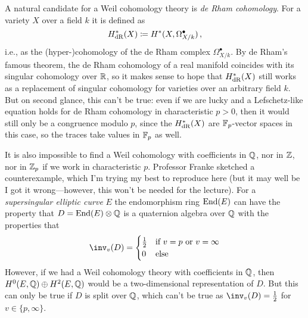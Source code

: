 \documentclass[a4paper, 10pt, oneside, DIV=9, chapterprefix=true, numbers=enddot]{scrbook}
\begin{document}
	A natural candidate for a Weil cohomology theory is \emph{de Rham cohomology}. For a variety $X$ over a field $k$ it is defined as 
	\begin{equation*}
		H_{\mathrm{dR}}^*(X)\coloneqq H^*(X,\Omega_{X/k}^\bullet)\,,
	\end{equation*}
	i.e., as the (hyper-)cohomology of the de Rham complex $\Omega_{X/k}^\bullet$.	By de Rham's famous theorem, the de Rham cohomology of a real manifold coincides with its singular cohomology over $\mathbb{R}$, so it makes sense to hope that $H_{\mathrm{dR}}^*(X)$ still works as a replacement of singular cohomology for varieties over an arbitrary field $k$. But on second glance, this can't be true: even if we are lucky and a Lefschetz-like equation holds for de Rham cohomology in characteristic $p >0$, then it would still only be a congruence modulo $p$, since the $H_{\mathrm{dR}}^*(X)$ are $\mathbb{F}_p$-vector spaces in this case, so the traces take values in $\mathbb{F}_p$ as well.
	
	It is also impossible to find a Weil cohomology with coefficients in $\mathbb{Q}$, nor in $\mathbb{Z}$, nor in $\mathbb{Z}_p$ if we work in characteristic $p$. Professor Franke sketched a counterexample, which I'm trying my best to reproduce here (but it may well be I got it wrong---however, this won't be needed for the lecture). For a \emph{supersingular elliptic curve} $E$ the endomorphism ring $\operatorname{End}(E)$ can have the property that $D=\operatorname{End}(E)\otimes \mathbb{Q}$ is a quaternion algebra over $\mathbb{Q}$ with the properties that
	\begin{align*}
		\inv_v(D)=\begin{cases}
			\frac{1}{2} & \text{if }v=p\text{ or }v=\infty\\
			0 & \text{else}
		\end{cases}
	\end{align*}
	However, if we had a Weil cohomology theory with coefficients in $\mathbb{Q}$, then $H^0(E,\mathbb{Q})\oplus H^2(E,\mathbb{Q})$ would be a two-dimensional representation of $D$. But this can only be true if $D$ is split over $\mathbb{Q}$, which can't be true as $\inv_v(D)=\frac12$ for $v\in\{p,\infty\}$.
	
\end{document}
